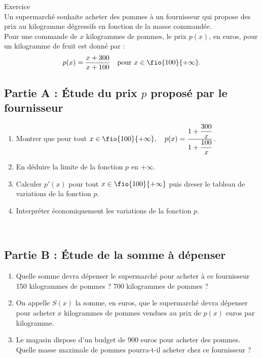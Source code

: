 \documentclass[a4paper,11pt,eval]{nsi}
\newcounter{exoNum}
\newcommand{\exo}[1]
{
	\addtocounter{exoNum}{1}
	{\titlefont\color{UGLiBlue}\Large Exercice\ \theexoNum\ \normalsize{#1}}\smallskip	
}
\begin{document}
\exo{}\\
Un supermarché souhaite acheter des pommes à un fournisseur qui propose des prix au kilogramme dégressifs en fonction de la masse commandée.\\
Pour une commande de $x$ kilogrammes de pommes, le prix $p(x)$, en euros, pour un kilogramme de fruit est donné par :
$$ p(x)=\dfrac{x+300}{x+100}\quad \text{pour }x\in\fio{100}{+\infty}.$$
\subsection*{Partie A : Étude du prix $p$ proposé par le fournisseur}
\begin{enumerate}
    \item Montrer que pour tout $x\in\fio{100}{+\infty}, \quad p(x)=\dfrac{1+\dfrac{300}{x}}{1+\dfrac{100}{x}}$.
    \item En déduire la limite de la fonction $p$ en $+\infty$.
    \item Calculer $p'(x)$ pour tout $x\in\fio{100}{+\infty}$ puis dreser le tableau de variations de la fonction $p$.
    \item Interpréter économiquement les variations de la fonction $p$.
\end{enumerate}
\\
\subsection*{Partie B : Étude de la somme à dépenser}
\begin{enumerate}
    \item Quelle somme devra dépenser le supermarché pour acheter à ce fournisseur 150 kilogrammes de pommes ? 700 kilogrammes de pommes ?\\[.5em]
    \item On appelle $S(x)$ la somme, en euros, que le supermarché devra dépenser pour acheter $x$ kilogrammes de pommes vendues au prix de $p(x)$ euros par kilogramme.
    \item Le magasin dispose d'un budget de 900 euros pour acheter des pommes. Quelle masse maximale de pommes pourra-t-il acheter chez ce fournisseur ? 
\end{enumerate}
\\
\end{document}
